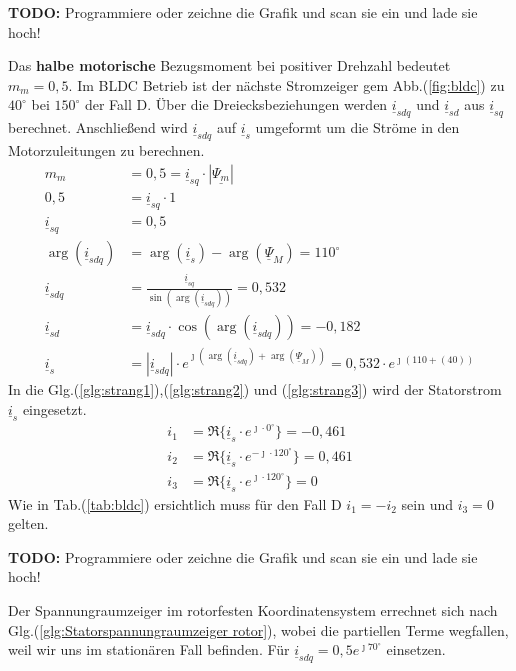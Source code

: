 \begin{solution}
\begin{compactenum}
\textbf{TODO:} Programmiere oder zeichne die Grafik und scan sie ein und lade sie hoch!
\item Das \textbf{halbe motorische} Bezugsmoment bei positiver Drehzahl bedeutet $m_m = 0,5$. Im BLDC Betrieb ist der nächste Stromzeiger gem Abb.(\ref{fig:bldc}) zu $40^\circ$ bei $150^\circ$ der Fall D. Über die Dreiecksbeziehungen werden $\underline{i}_{sdq}$ und $\underline{i}_{sd}$ aus $\underline{i}_{sq}$ berechnet. Anschließend wird $\underline{i}_{sdq}$ auf $\underline{i}_{s}$ umgeformt um die Ströme in den Motorzuleitungen zu berechnen.
\begin{align}
m_m &= 0,5 = \underline{i}_{sq} \cdot |\underline{\Psi_m}|\\
0,5 &= \underline{i}_{sq} \cdot 1\\
\underline{i}_{sq} &= 0,5\\
\arg(\underline{i}_{sdq}) &= \arg(\underline{i}_{s}) -\arg(\underline{\Psi}_{M})=110^\circ\\
\underline{i}_{sdq} &= \frac{\underline{i}_{sq}}{\sin(\arg(\underline{i}_{sdq}))}= 0,532\\
\underline{i}_{sd} &= \underline{i}_{sdq} \cdot \cos(\arg(\underline{i}_{sdq})) = -0,182\\
\underline{i}_{s} &= |\underline{i}_{sdq}| \cdot e^{\jmath (\arg(\underline{i}_{sdq}) + \arg(\underline{\Psi}_{M}))}= 0,532 \cdot e^{\jmath ( 110 + (40))}
\end{align}
In die Glg.(\ref{glg:strang1}),(\ref{glg:strang2}) und (\ref{glg:strang3}) wird der Statorstrom $\underline{i}_s$ eingesetzt.
\begin{align}
i_1 & = \Re \{ \underline{i}_s \cdot e^{\jmath \cdot 0 ^\circ} \} = -0,461\\
i_2 & = \Re \{ \underline{i}_s \cdot e^{-\jmath \cdot 120 ^\circ} \} = 0,461 \\
i_3 & = \Re \{ \underline{i}_s \cdot e^{\jmath \cdot 120 ^\circ} \}=  0
\end{align}
Wie in Tab.(\ref{tab:bldc}) ersichtlich muss für den Fall D $i_1= -i_2$ sein und $i_3= 0$ gelten.
\item \textbf{TODO:} Programmiere oder zeichne die Grafik und scan sie ein und lade sie hoch!
\item Der Spannungraumzeiger im rotorfesten Koordinatensystem errechnet sich nach Glg.(\ref{glg:Statorspannungraumzeiger rotor}), wobei die partiellen Terme wegfallen, weil wir uns im stationären Fall befinden. Für $\underline{i}_{sdq}= 0,5 e^{\jmath 70^\circ}$ einsetzen.
\begin{align}

\end{align}
\end{compactenum}
\end{solution}
